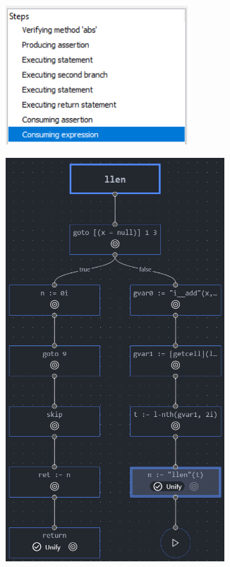 \begin{figure}
  \centering
  \begin{subfigure}[b]{0.4\textwidth}
    \center{}
    \includegraphics[width=0.75\textwidth]{img/verifast-path.png}
  \end{subfigure}
  \qquad
  \begin{subfigure}[b]{0.4\textwidth}
    \centering
    \includegraphics[width=0.9\textwidth]{img/execmap-final.png}

\end{subfigure}
\end{figure}
